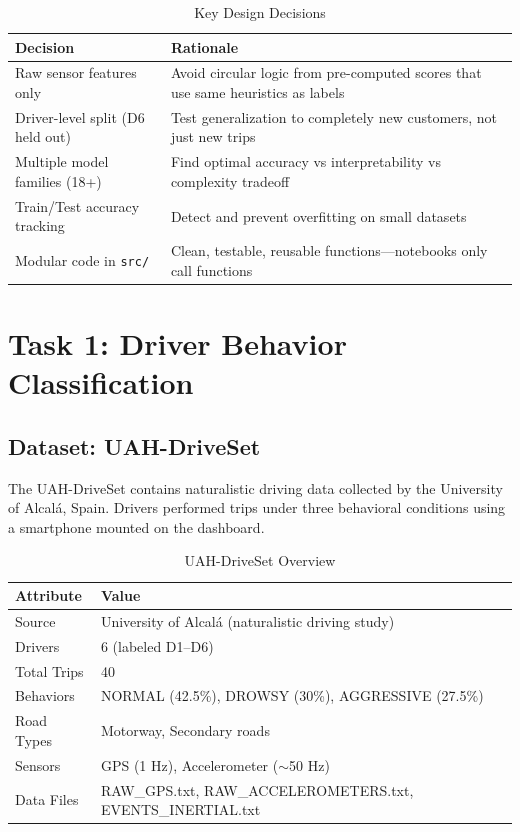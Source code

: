 \documentclass[11pt,a4paper]{article}
\begin{document}
\begin{table}[H]
\centering
\caption{Key Design Decisions}
\begin{tabular}{p{4.5cm}p{8cm}}
\toprule
\textbf{Decision} & \textbf{Rationale} \\
\midrule
Raw sensor features only & Avoid circular logic from pre-computed scores that use same heuristics as labels \\
Driver-level split (D6 held out) & Test generalization to completely new customers, not just new trips \\
Multiple model families (18+) & Find optimal accuracy vs interpretability vs complexity tradeoff \\
Train/Test accuracy tracking & Detect and prevent overfitting on small datasets \\
Modular code in \texttt{src/} & Clean, testable, reusable functions---notebooks only call functions \\
\bottomrule
\end{tabular}
\end{table}

\section{Task 1: Driver Behavior Classification}

\subsection{Dataset: UAH-DriveSet}

The UAH-DriveSet contains naturalistic driving data collected by the University of Alcalá, Spain. Drivers performed trips under three behavioral conditions using a smartphone mounted on the dashboard.

\begin{table}[H]
\centering
\caption{UAH-DriveSet Overview}
\begin{tabular}{ll}
\toprule
\textbf{Attribute} & \textbf{Value} \\
\midrule
Source & University of Alcalá (naturalistic driving study) \\
Drivers & 6 (labeled D1--D6) \\
Total Trips & 40 \\
Behaviors & NORMAL (42.5\%), DROWSY (30\%), AGGRESSIVE (27.5\%) \\
Road Types & Motorway, Secondary roads \\
Sensors & GPS (1 Hz), Accelerometer ($\sim$50 Hz) \\
Data Files & RAW\_GPS.txt, RAW\_ACCELEROMETERS.txt, EVENTS\_INERTIAL.txt \\
\bottomrule
\end{tabular}
\end{table}
\end{document}
